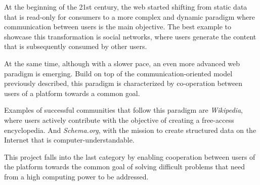 At the beginning of the 21st century, the web started shifting from static data that is read-only for consumers to a more complex and dynamic paradigm where communication between users is the main objective. The best example to showcase this transformation is social networks, where users generate the content that is subsequently consumed by other users.

At the same time, although with a slower pace, an even more advanced web paradigm is emerging. Build on top of the communication-oriented model previously described, this paradigm is characterized by co-operation between users of a platform towards a common goal. 

Examples of successful communities that follow this paradigm are \textit{Wikipedia}, where users actively contribute with the objective of creating a free-access encyclopedia. And \textit{Schema.org}, with the mission to create structured data on the Internet that is computer-understandable.

This project falls into the last category by enabling cooperation between users of the platform towards the common goal of solving difficult problems that need from a high computing power to be addressed.




































